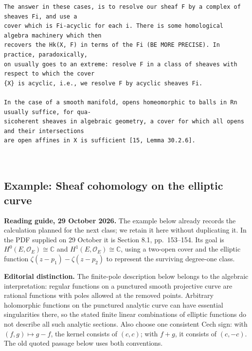 \begin{Verbatim}[fontsize=\footnotesize]
The answer in these cases, is to resolve our sheaf F by a complex of sheaves Fi, and use a
cover which is Fi-acyclic for each i. There is some homological algebra machinery which then
recovers the Hk(X, F) in terms of the Fi (BE MORE PRECISE). In practice, paradoxically,
on usually goes to an extreme: resolve F in a class of sheaves with respect to which the cover
{X} is acyclic, i.e., we resolve F by acyclic sheaves Fi.

In the case of a smooth manifold, opens homeomorphic to balls in Rn usually suffice, for qua-
sicoherent sheaves in algebraic geometry, a cover for which all opens and their intersections
are open affines in X is sufficient [15, Lemma 30.2.6].



\end{Verbatim}

\subsection{Example: Sheaf cohomology on the elliptic curve}
\label{subsection-jethro-cech-3}


\noindent
{\bf Reading guide, 29 October 2026.}
The example below already records the
calculation planned for the next class;
we retain it here without duplicating it.
In the PDF supplied on 29 October it is
Section 8.1, pp.~153--154. Its goal is
$H^0(E,\mathcal O_E)\cong\mathbb C$ and
$H^1(E,\mathcal O_E)\cong\mathbb C$,
using a two-open cover and the elliptic
function $\zeta(z-p_1)-\zeta(z-p_2)$
to represent the surviving degree-one
class.

\noindent
{\bf Editorial distinction.}
The finite-pole description below belongs
to the algebraic interpretation: regular
functions on a punctured smooth projective
curve are rational functions with poles
allowed at the removed points. Arbitrary
holomorphic functions on the punctured
analytic curve can have essential
singularities there, so the stated finite
linear combinations of elliptic functions
do not describe all such analytic
sections. Also choose one consistent
Cech sign: with $(f,g)\mapsto g-f$, the
kernel consists of $(c,c)$; with $f+g$,
it consists of $(c,-c)$. The old quoted
passage below uses both conventions.

